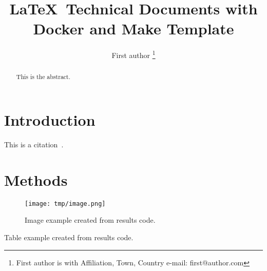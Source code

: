 \documentclass{article}
\begin{document}

\title{\LaTeX\ Technical Documents with Docker and Make Template}

\author{First author
\thanks{First author is with Affiliation, Town, Country e-mail: first@author.com}}

\maketitle

\begin{abstract}
	This is the abstract.
\end{abstract}

\section{Introduction}
This is a citation~\cite{author2000title}.

\section{Methods}

\begin{figure}
	\texttt{[image: tmp/image.png]}
	\caption{Image example created from results code.}
	\label{fig:image}
\end{figure}

\begin{table}
	\centering
	\caption{Table example created from results code.}
	\label{table:table}
	\setlength\tabcolsep{4.2pt}
	
\end{table}



\end{document}
